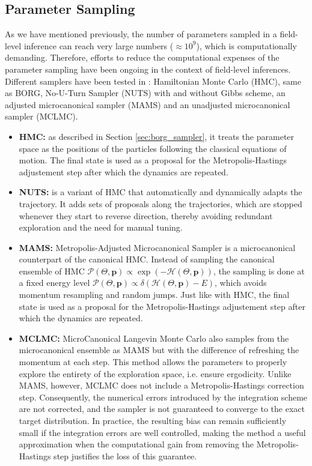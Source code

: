 \subsection{Parameter Sampling}

As we have mentioned previously, the number of parameters sampled in a field-level inference can reach very large numbers ($\approx 10^9$), which is computationally demanding. 
Therefore, efforts to reduce the computational expenses of the parameter sampling have been ongoing in the context of field-level inferences. Different samplers 
have been tested in \cite{Simon_2025}: Hamiltonian Monte Carlo (HMC), same as BORG, No-U-Turn Sampler (NUTS) with and without Gibbs scheme, an adjusted microcanonical 
sampler (MAMS) and an unadjusted microcanonical sampler (MCLMC). 
\begin{itemize}
    \item \textbf{HMC:} as described in Section \ref{sec:borg_sampler}, it treats the parameter space as the positions of the particles following the classical equations of motion. 
    The final state is used as a proposal for the Metropolis-Hastings adjustement step after which the dynamics are repeated.
    \item \textbf{NUTS:} is a variant of HMC that automatically and dynamically adapts the trajectory. It adds sets of proposals along the 
    trajectories, which are stopped whenever they start to reverse direction, thereby avoiding redundant exploration and the need for manual tuning.
    \item \textbf{MAMS:} Metropolis-Adjusted Microcanonical Sampler is a microcanonical counterpart of the canonical HMC. Instead of sampling the canonical ensemble of HMC $\mathcal{P}(\Theta, \textbf{p}) \propto \exp(-\mathcal{H}(\Theta, \textbf{p}))$, 
    the sampling is done at a fixed energy level $\mathcal{P}(\Theta, \textbf{p}) \propto \delta(\mathcal{H}(\Theta, \textbf{p})- E)$, which avoids momentum resampling and random 
    jumps. Just like with HMC, the final state is used as a proposal for the Metropolis-Hastings adjustement step after which the dynamics are repeated.
    \item \textbf{MCLMC:} MicroCanonical Langevin Monte Carlo also samples from the microcanonical ensemble as MAMS but with the difference of refreshing the momentum at each step. 
    This method allows the parameters to properly explore the entirety of the exploration space, i.e. ensure ergodicity. Unlike MAMS, however, 
    MCLMC does not include a Metropolis-Hastings correction step. Consequently, 
    the numerical errors introduced by the integration scheme are not corrected, 
    and the sampler is not guaranteed to converge to the exact target 
    distribution. In practice, the resulting bias can remain sufficiently small 
    if the integration errors are well controlled, making the method a useful 
    approximation when the computational gain from removing the 
    Metropolis-Hastings step justifies the loss of this guarantee. 
\end{itemize} 


